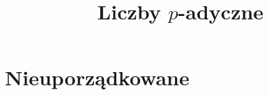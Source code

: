 \documentclass[a4paper, fleqn]{extreport}
\title{Liczby $p$-adyczne}
\numberwithin{dummy}{section}
\begin{document}
\maketitle
\tableofcontents

\chapter{Nieuporządkowane}








\end{document}
